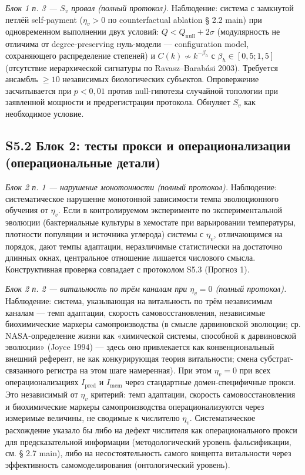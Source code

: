 \documentclass[pdflatex,sn-mathphys-ay]{sn-jnl}
\begin{document}
\emph{Блок 1 п. 3 --- \(S_v\) провал (полный протокол).} Наблюдение: система с замкнутой петлёй self-payment (\(\eta_v > 0\) по counterfactual ablation § 2.2 main) при одновременном выполнении двух условий: \(Q < Q_{\text{null}} + 2\sigma\) (модулярность не отличима от degree-preserving нуль-модели --- configuration model, сохраняющего распределение степеней) и \(C(k) \not\sim k^{-\beta_h}\) с \(\beta_h \in [0{,}5; 1{,}5]\) (отсутствие иерархической сигнатуры по Ravasz--Barabási 2003). Требуется ансамбль \(\ge 10\) независимых биологических субъектов. Опровержение засчитывается при \(p < 0{,}01\) против null-гипотезы случайной топологии при заявленной мощности и предрегистрации протокола. Обнуляет \(S_v\) как необходимое условие.

\subsection*{S5.2 Блок 2: тесты прокси и операционализации (операциональные детали)}\label{s5.2-ux431ux43bux43eux43a-2-ux442ux435ux441ux442ux44b-ux43fux440ux43eux43aux441ux438-ux438-ux43eux43fux435ux440ux430ux446ux438ux43eux43dux430ux43bux438ux437ux430ux446ux438ux438-ux43eux43fux435ux440ux430ux446ux438ux43eux43dux430ux43bux44cux43dux44bux435-ux434ux435ux442ux430ux43bux438}

\emph{Блок 2 п. 1 --- нарушение монотонности (полный протокол).} Наблюдение: систематическое нарушение монотонной зависимости темпа эволюционного обучения от \(\eta_v\). Если в контролируемом эксперименте по экспериментальной эволюции (бактериальные культуры в хемостате при варьировании температуры, плотности популяции и источника углерода) системы с \(\eta_v\), отличающимся на порядок, дают темпы адаптации, неразличимые статистически на достаточно длинных окнах, центральное отношение лишается числового смысла. Конструктивная проверка совпадает с протоколом S5.3 (Прогноз 1).

\emph{Блок 2 п. 2 --- витальность по трём каналам при \(\eta_v = 0\) (полный протокол).} Наблюдение: система, указывающая на витальность по трём независимым каналам --- темп адаптации, скорость самовосстановления, независимые биохимические маркеры самопроизводства (в смысле дарвиновской эволюции; ср. NASA-определение жизни как «химической системы, способной к дарвиновской эволюции» (Joyce 1994) --- здесь оно привлекается как конвенциональный внешний референт, не как конкурирующая теория витальности; смена субстрат-связанного регистра на этом шаге намеренная). При этом \(\eta_v = 0\) при всех операционализациях \(I_{\text{pred}}\) и \(I_{\text{mem}}\) через стандартные домен-специфичные прокси. Это независимый от \(\eta_v\) критерий: темп адаптации, скорость самовосстановления и биохимические маркеры самопроизводства операционализуются через измеримые величины, не сводимые к числителю \(\eta_v\). Систематическое расхождение указало бы либо на дефект числителя как операционального прокси для предсказательной информации (методологический уровень фальсификации, см. § 2.7 main), либо на несостоятельность самого концепта витальности через эффективность самомоделирования (онтологический уровень).
\end{document}
